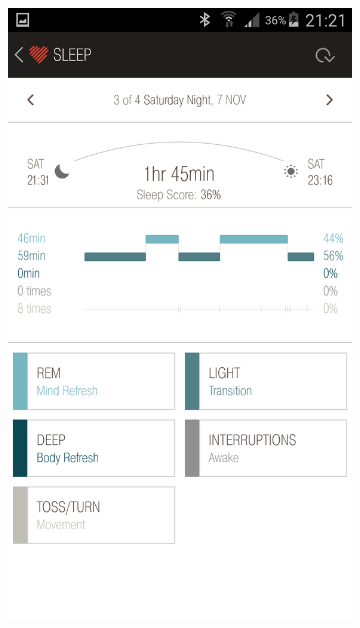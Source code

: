 \documentclass[12pt,a4paper]{article}
\begin{document}
\newpage

\begin{figure}[H]
    \begin{subfigure}[b]{0.5\textwidth}
        \includegraphics[width=\textwidth]{07-11-15-3.png}
     \end{subfigure}
    ~ %
    \begin{subfigure}[b]{0.5\textwidth}

\end{subfigure}
\end{figure}
\end{document}
